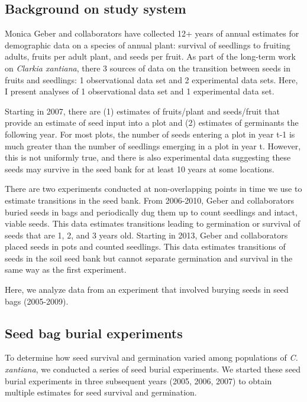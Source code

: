 \documentclass[12pt, oneside, titlepage]{article}   	%
\begin{document}
\subsection*{Background on study system}

Monica Geber and collaborators have collected 12+ years of annual estimates for demographic data on a species of annual plant: survival of seedlings to fruiting adults, fruits per adult plant, and seeds per fruit. As part of the long-term work on \textit{Clarkia xantiana}, there 3 sources of data on the transition between seeds in fruits and seedlings: 1 observational data set and 2 experimental data sets. Here, I present analyses of 1 observational data set and 1 experimental data set. 

Starting in 2007, there are (1) estimates of fruits/plant and seeds/fruit that provide an estimate of seed input into a plot and (2) estimates of germinants the following year. For most plots, the number of seeds entering a plot in year t-1 is much greater than the number of seedlings emerging in a plot in year t. However, this is not uniformly true, and there is also experimental data suggesting these seeds may survive in the seed bank for at least 10 years at some locations.

There are two experiments conducted at non-overlapping points in time we use to estimate transitions in the seed bank. From 2006-2010, Geber and collaborators buried seeds in bags and periodically dug them up to count seedlings and intact, viable seeds. This data estimates transitions leading to germination or survival of seeds that are 1, 2, and 3 years old. Starting in 2013, Geber and collaborators placed seeds in pots and counted seedlings. This data estimates transitions of seeds in the soil seed bank but cannot separate germination and survival in the same way as the first experiment.

Here, we analyze data from an experiment that involved burying seeds in seed bags (2005-2009). 

\subsection*{Seed bag burial experiments}

To determine how seed survival and germination varied among populations of \textit{C. xantiana}, we conducted a series of seed burial experiments. We started these seed burial experiments in three subsequent years (2005, 2006, 2007) to obtain multiple estimates for seed survival and germination.
\end{document}
